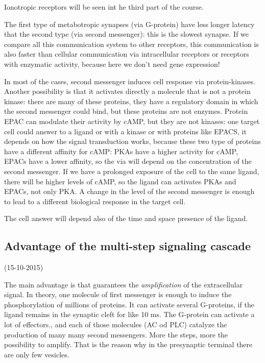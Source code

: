 \documentclass[a4paper, 12pt]{book}
\begin{document}
Ionotropic receptors will be seen int he third part of the course.

The first type of metabotropic synapses (via G-protein) have less longer latency that the second type (via second messenger): this is the slowest synapse. If we compare all this communication system to other receptors, this communication is also faster than cellular communication via intracellular receptors or receptors with enzymatic activity, because here we don't need gene expression!

In most of the cases, second messenger induces cell response via protein-kinases. Another possibility is that it activates directly a molecule that is not a protein kinase: there are many of these proteins, they have a regulatory domain in which the second messenger could bind, but these proteins are not enzymes. Protein EPAC can modulate their activity by cAMP, but they are not kinases: one target cell could answer to a ligand or with a kinase or with proteins like EPACS, it depends on how the signal transduction works, because these two type of proteins have a different affinity for cAMP: PKAs have a higher activity for cAMP, EPACs have a lower affinity, so the via will depend on the concentration of the second messenger. If we have a prolonged exposure of the cell to the same ligand, there will be higher levels of cAMP, so the ligand can activates PKAs and EPACs, not only PKA.
A change in the level of the second messenger is enough to lead to a different biological response in the target cell.

The cell answer will depend also of the time and space presence of the ligand.



\subsection{Advantage of the multi-step signaling cascade}
(15-10-2015)

The main advantage is that guarantees the \emph{amplification} of the extracellular signal. In theory, one molecule of first messenger is enough to induce the phosphorylation of millions of proteins. It can activate several G-proteins, if the ligand remains in the synaptic cleft for like 10 ms. The G-protein can activate a lot of effectors., and each of those molecules (AC od PLC) catalyze the production of many many second messengers. More the steps, more the possibility to amplify. That is the reason why in the presynaptic terminal there are only few vesicles. 
\end{document}
